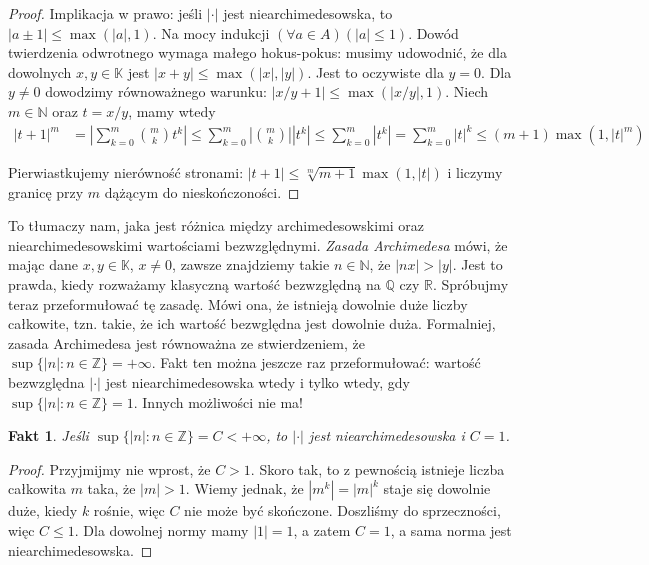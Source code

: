 \documentclass[a4paper,fleqn,9pt]{extarticle}
\newtheorem{fkt}{Fakt}
\begin{document}
\begin{proof}
Implikacja w prawo: jeśli $|\cdot|$ jest niearchimedesowska, to $|a\pm 1| \le \max(|a|, 1)$.
Na mocy indukcji $(\forall a \in A)(|a| \le 1)$.
Dowód twierdzenia odwrotnego wymaga małego hokus-pokus: musimy udowodnić, że dla dowolnych $x,y\in\mathbb K$ jest $|x+y|\le \max(|x|,|y|)$.
Jest to oczywiste dla $y=0$.
Dla $y\neq 0$ dowodzimy równoważnego warunku: $|x/y+1| \le \max (|x/y|,1)$.
Niech $m\in \mathbb N$ oraz $t = x/y$, mamy wtedy
\begin{align*}
|t+1|^m &
   = \left| \sum_{k=0}^m {m \choose k} t^k\right|
 \le \sum_{k=0}^m \left|{m \choose k}\right|\left| t^k\right|
 \le \sum_{k=0}^m \left| t^k\right|
   = \sum_{k=0}^m \left| t\right|^k
 \le (m+1) \max(1, |t|^m)
\end{align*}

Pierwiastkujemy nierówność stronami: $|t+1| \le \sqrt[m]{m+1} \max(1,|t|)$ i liczymy granicę przy $m$ dążącym do nieskończoności.
\end{proof}

To tłumaczy nam, jaka jest różnica między archimedesowskimi oraz niearchimedesowskimi wartościami bezwzględnymi.
\emph{Zasada Archimedesa} mówi, że mając dane $x,y\in \mathbb K$, $x\neq 0$, zawsze znajdziemy takie $n\in\mathbb N$, że $|nx| > |y|$.
Jest to prawda, kiedy rozważamy klasyczną wartość bezwzględną na $\mathbb Q$ czy $\mathbb R$.
Spróbujmy teraz przeformułować tę zasadę.
Mówi ona, że istnieją dowolnie duże liczby całkowite, tzn. takie, że ich wartość bezwględna jest dowolnie duża.
Formalniej, zasada Archimedesa jest równoważna ze stwierdzeniem, że $\sup\{|n|:n\in\mathbb Z\} = +\infty$.
Fakt ten można jeszcze raz przeformułować: wartość bezwzględna $|\cdot|$ jest niearchimedesowska wtedy i tylko wtedy, gdy $\sup\{|n|:n\in\mathbb Z\} = 1$.
Innych możliwości nie ma!

\begin{fkt}
Jeśli $\sup\{|n|:n\in\mathbb Z\} = C < +\infty$, to $|\cdot|$ jest niearchimedesowska i $C = 1$.
\end{fkt}

\begin{proof}
Przyjmijmy nie wprost, że $C > 1$.
Skoro tak, to z pewnością istnieje liczba całkowita $m$ taka, że $|m| > 1$.
Wiemy jednak, że $|m^k| = |m|^k$ staje się dowolnie duże, kiedy $k$ rośnie, więc $C$ nie może być skończone.
Doszliśmy do sprzeczności, więc $C \le 1$.
Dla dowolnej normy mamy $|1| = 1$, a zatem $C=1$, a sama norma jest niearchimedesowska.
\end{proof}
\end{document}
